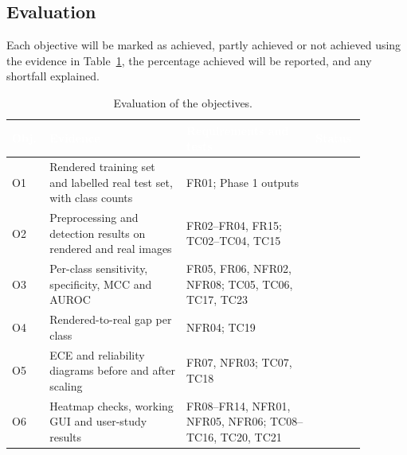 \subsection{Evaluation}
\label{sec:eval}

Each objective will be marked as achieved, partly achieved or not achieved using the evidence in Table~\ref{tab:obj-eval}, the percentage achieved will be reported, and any shortfall explained.

\begin{table}[H]
  \centering
  \footnotesize
  \setlength{\arrayrulewidth}{0.8pt}
  \renewcommand{\arraystretch}{1.12}
  \caption{Evaluation of the objectives.}
  \label{tab:obj-eval}
  \begin{tabular}{|p{0.07\linewidth}|p{0.36\linewidth}|p{0.34\linewidth}|p{0.11\linewidth}|}
    \hline
    \rowcolor{cyan!90!black}
    \textcolor{white}{\textbf{Obj.}} & \textcolor{white}{\textbf{Evidence}} &
    \textcolor{white}{\textbf{Requirements and tests}} & \textcolor{white}{\textbf{Status}} \\
    \hline
    O1 & Rendered training set and labelled real test set, with class counts & FR01; Phase 1 outputs & \\
    \hline
    O2 & Preprocessing and detection results on rendered and real images & FR02--FR04, FR15; TC02--TC04, TC15 & \\
    \hline
    O3 & Per-class sensitivity, specificity, MCC and AUROC & FR05, FR06, NFR02, NFR08; TC05, TC06, TC17, TC23 & \\
    \hline
    O4 & Rendered-to-real gap per class & NFR04; TC19 & \\
    \hline
    O5 & ECE and reliability diagrams before and after scaling & FR07, NFR03; TC07, TC18 & \\
    \hline
    O6 & Heatmap checks, working GUI and user-study results & FR08--FR14, NFR01, NFR05, NFR06; TC08--TC16, TC20, TC21 & \\
    \hline
  \end{tabular}
\end{table}

